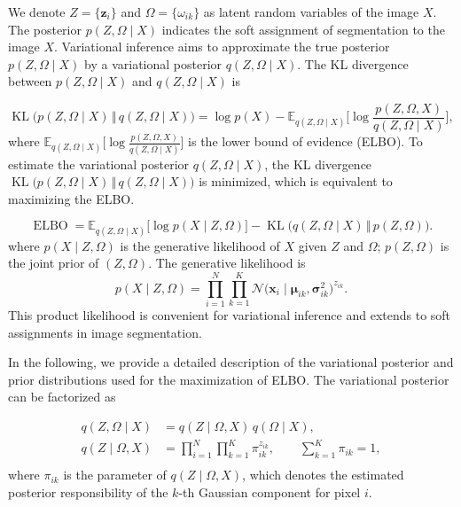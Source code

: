 \documentclass[preprint,12pt]{elsarticle}
\begin{document}
%
%
We denote $Z=\{\mathbf{z}_i\}$ and $\Omega=\{{\omega}_{ik}\}$ as latent random variables of the image $X$. 
The posterior $p(Z,\Omega\mid X)$ indicates the soft assignment of segmentation to the image $X$.
%
Variational inference aims to approximate the true posterior $p(Z,\Omega\mid X)$ by a variational posterior $q(Z,\Omega\mid X)$.
%
The KL divergence between $p(Z,\Omega\mid X)$ and $q(Z,\Omega\mid X)$ is 

\begin{equation}
\label{logp(x)}
  \operatorname{KL}\big(p(Z,\Omega\mid X)\,\Vert\,q(Z,\Omega \mid X)\big) 
  = \log p(X) - \mathbb{E}_{q(Z,\Omega\mid X)}\big[\log \frac{p(Z, \Omega , X)}{q(Z,\Omega\mid X)} \big],
\end{equation}
where $\mathbb{E}_{q(Z,\Omega\mid X)}\big[\log \frac{p(Z, \Omega , X)}{q(Z,\Omega\mid X)} \big]$ is the lower bound of evidence (ELBO).
To estimate the variational posterior $q(Z,\Omega\mid X)$, the KL divergence $\operatorname{KL}\big(p(Z,\Omega\mid X)\,\Vert\,q(Z,\Omega \mid X)\big)$ is minimized, which is equivalent to maximizing the ELBO.

\begin{equation}
\label{elbo}
  \operatorname{ELBO}
  = \mathbb{E}_{q(Z,\Omega\mid X)}\big[\log p(X\mid Z, \Omega)\big]
  - \operatorname{KL}\big(q(Z,\Omega\mid X)\,\Vert\,p(Z,\Omega)\big).
\end{equation}
where $p(X\mid Z, \Omega)$ is the generative likelihood of $X$ given $Z$ and $\Omega$; $p(Z,\Omega)$ is the joint prior of $(Z,\Omega)$.
The generative likelihood is
\begin{equation}
  p(X\mid Z, \Omega)
  = \prod_{i=1}^N\prod_{k=1}^K \mathcal{N}\bigl(\boldsymbol{x}_i\mid \boldsymbol{\mu}_{ik},\boldsymbol{\sigma}^2_{ik}\bigr)^{z_{ik}}.
\end{equation}
%
This product likelihood is convenient for variational inference and extends to soft assignments in image segmentation.



In the following, we provide a detailed description of the variational posterior and prior distributions used for the maximization of ELBO.
The variational posterior can be factorized as


\begin{equation}
\label{posterior}
\begin{split}
  q(Z,\Omega\mid X) &= q(Z\mid \Omega, X)\,q(\Omega\mid X),\\
  q(Z\mid \Omega, X) &=  \prod_{i=1}^N\prod_{k=1}^K \pi_{ik}^{z_{ik}},\qquad \sum_{k=1}^K \pi_{ik}=1,\\
\end{split}
\end{equation}
where $\pi_{ik}$ is the parameter of $q(Z\mid \Omega, X)$, which denotes the estimated posterior responsibility of the $k$-th Gaussian component for pixel $i$.
\end{document}
